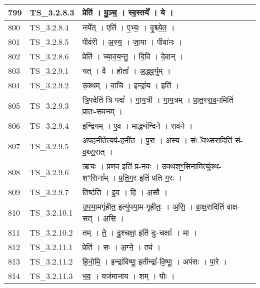\documentclass[17pt]{extarticle}
\begin{document}
\begin{longtable}{||p{0.4in}||p{0.9in}||p{4.0in}||p{0.9in}||}
        \hline
            799 & TS\_3.2.8.3 & प्रेति॑   ।   मु॒ञ्च॒   ।   स्व॒स्तये᳚   ।   ये   ।    &      \\
        \hline
            800 & TS\_3.2.8.4 & नये᳚त्   ।   एति॑   ।   ए॒भ्यः॒   ।   वृ॒श्च्ये॒त॒   ।    &      \\
        \hline
            801 & TS\_3.2.8.5 & पीव॑री   ।   अ॒स्य॒   ।   जा॒या   ।   पीवा॑नः   ।    &      \\
        \hline
            802 & TS\_3.2.8.6 & प्रेति॑   ।   च्या॒व॒य॒न्तु॒   ।   दि॒वि   ।   दे॒वान्   ।    &      \\
        \hline
            803 & TS\_3.2.9.1 & यत्   ।   वै   ।   होता᳚   ।   अ॒द्ध्व॒र्युम्   ।    &      \\
        \hline
            804 & TS\_3.2.9.2 & उ॒क्थम्   ।   वा॒चि   ।   इन्द्रा॑य   ।   इति॑   ।    &      \\
        \hline
            805 & TS\_3.2.9.3 & त्रि॒पदेति॑ त्रि{-}पदा᳚   ।   गा॒य॒त्री   ।   गा॒य॒त्रम्   ।   प्रा॒त॒स्स॒व॒नमिति॑ प्रातः{-}स॒व॒नम्   ।    &      \\
        \hline
            806 & TS\_3.2.9.4 & इ॒न्द्रि॒यम्   ।   ए॒व   ।   माद्ध्य॑न्दिने   ।   सव॑ने   ।    &      \\
        \hline
            807 & TS\_3.2.9.5 & अ॒प॒हनी॒तेत्यप॑{-}हनी॑त   ।   पु॒रा   ।   अ॒स्य॒   ।   सं॒ॅव॒थ्स॒रादिति॑ सं{-}व॒थ्स॒रात्   ।    &      \\
        \hline
            808 & TS\_3.2.9.6 & ऋ॒चः   ।   प्र॒ण॒व इति॑ प्र{-}न॒वः   ।   उ॒क्थ॒शꣳ॒॒सिना॒मित्यु॑क्थ{-}शꣳ॒॒सिना᳚म्   ।   प्र॒ति॒ग॒र इति॑ प्रति{-}ग॒रः   ।    &      \\
        \hline
            809 & TS\_3.2.9.7 & तिष्ठ॑ति   ।   इ॒व॒   ।   हि   ।   अ॒सौ   ।    &      \\
        \hline
            810 & TS\_3.2.10.1 & उ॒प॒या॒मगृ॑हीत॒ इत्यु॑पया॒म{-}गृ॒ही॒तः॒   ।   अ॒सि॒   ।   वा॒क्ष॒सदिति॑ वाक्ष{-}सत्   ।   अ॒सि॒   ।    &      \\
        \hline
            811 & TS\_3.2.10.2 & तम्   ।   ते॒   ।   दु॒श्चक्षा॒ इति॑ दुः{-}चक्षाः᳚   ।   मा   ।    &      \\
        \hline
            812 & TS\_3.2.11.1 & प्रेति॑   ।   सः   ।   अ॒ग्ने॒   ।   तव॑   ।    &      \\
        \hline
            813 & TS\_3.2.11.2 & हि॒नो॒मि॒   ।   इन्द्रा॑विष्णू॒ इतीन्द्रा᳚{-}वि॒ष्णू॒   ।   अप॑सः   ।   पा॒रे   ।    &      \\
        \hline
            814 & TS\_3.2.11.3 & भ॒व॒   ।   यज॑मानाय   ।   शम्   ।   योः   ।    &      \\

\end{longtable}
\end{document}
